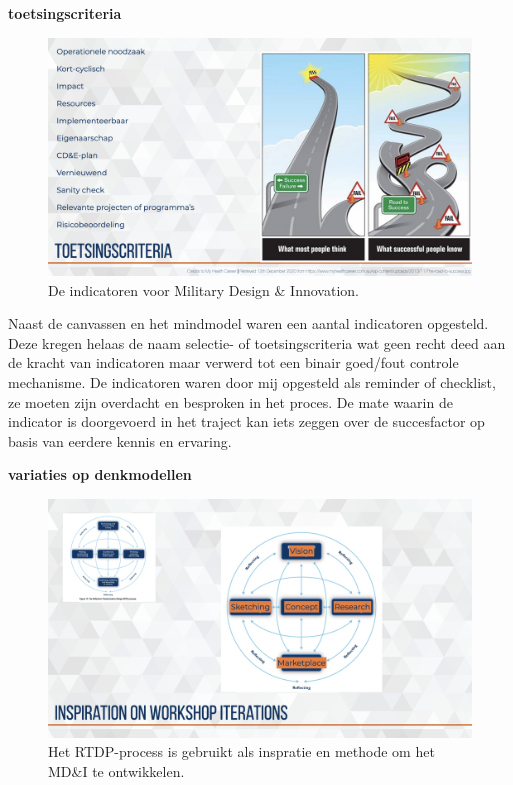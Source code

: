 \documentclass[
]{book}
\begin{document}
\textbf{toetsingscriteria}

\begin{figure}

{\centering \includegraphics[width=0.5\linewidth]{data/keynote-slides/20200430-CDE-Designprocess/20200430-CDE-Designprocess.024} 

}

\caption{De indicatoren voor Military Design \& Innovation.}\label{fig:unnamed-chunk-19}
\end{figure}

Naast de canvassen en het mindmodel waren een aantal indicatoren opgesteld. Deze kregen helaas de naam selectie- of toetsingscriteria wat geen recht deed aan de kracht van indicatoren maar verwerd tot een binair goed/fout controle mechanisme. De indicatoren waren door mij opgesteld als reminder of checklist, ze moeten zijn overdacht en besproken in het proces. De mate waarin de indicator is doorgevoerd in het traject kan iets zeggen over de succesfactor op basis van eerdere kennis en ervaring.

\textbf{variaties op denkmodellen}

\begin{figure}

{\centering \includegraphics[width=26.67in]{data/keynote-slides/20200430-CDE-Designprocess/20200430-CDE-Designprocess.024-1} 

}

\caption{Het RTDP-process is gebruikt als inspratie en methode om het MD\&I te ontwikkelen.}\label{fig:unnamed-chunk-20}
\end{figure}
\end{document}
